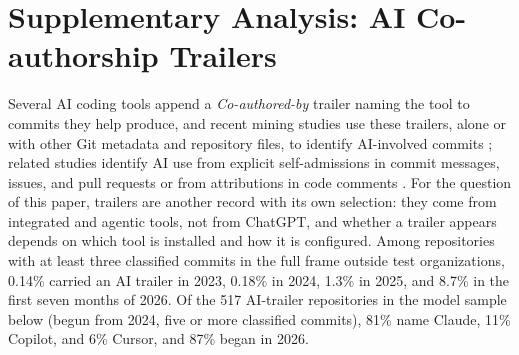 \documentclass[acmsmall,screen,review,anonymous]{acmart}
\begin{document}


\FloatBarrier
\section{Supplementary Analysis: AI Co-authorship Trailers}
\label{app:trailers}

Several AI coding tools append a \textit{Co-authored-by} trailer naming the tool to commits they help produce, and recent mining studies use these trailers, alone or with other Git metadata and repository files, to identify AI-involved commits \citep{khosravani2026census, quispe2026coding, liu2026debt}; related studies identify AI use from explicit self-admissions in commit messages, issues, and pull requests \citep{tufano2026selfadmitted} or from attributions in code comments \citep{mao2026largescale}. For the question of this paper, trailers are another record with its own selection: they come from integrated and agentic tools, not from ChatGPT, and whether a trailer appears depends on which tool is installed and how it is configured. Among repositories with at least three classified commits in the full frame outside test organizations, 0.14\% carried an AI trailer in 2023, 0.18\% in 2024, 1.3\% in 2025, and 8.7\% in the first seven months of 2026. Of the 517 AI-trailer repositories in the model sample below (begun from 2024, five or more classified commits), 81\% name Claude, 11\% Copilot, and 6\% Cursor, and 87\% began in 2026.
\end{document}
